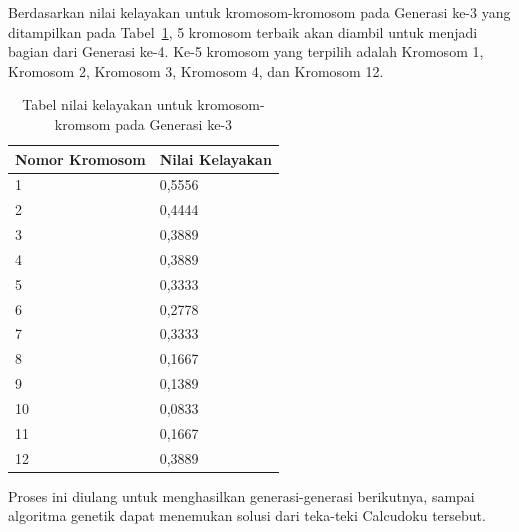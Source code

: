 \clearpage

Berdasarkan nilai kelayakan untuk kromosom-kromosom pada Generasi ke-3 yang ditampilkan pada Tabel~\ref{tab:analisishg4}, 5 kromosom terbaik akan diambil untuk menjadi bagian dari Generasi ke-4. Ke-5 kromosom yang terpilih adalah Kromosom 1, Kromosom 2, Kromosom 3, Kromosom 4, dan Kromosom 12.

\begin{table}
\centering
\captionsetup{justification=centering}
\begin{tabular}{| l | l |}
\hline
Nomor Kromosom & Nilai Kelayakan \\
\hline \hline
1 & 0,5556 \\
\hline
2 & 0,4444 \\
\hline
3 & 0,3889 \\
\hline
4 & 0,3889 \\
\hline
5 & 0,3333 \\
\hline
6 & 0,2778 \\
\hline
7 & 0,3333 \\
\hline
8 & 0,1667 \\
\hline
9 & 0,1389 \\
\hline
10 & 0,0833 \\
\hline
11 & 0,1667 \\
\hline
12 & 0,3889 \\
\hline
\end{tabular}
\caption[Tabel nilai kelayakan untuk kromosom-kromsom pada Generasi ke-3]{Tabel nilai kelayakan untuk kromosom-kromsom pada Generasi ke-3}
\label{tab:analisishg4}
\end{table}

Proses ini diulang untuk menghasilkan generasi-generasi berikutnya, sampai algoritma genetik dapat menemukan solusi dari teka-teki Calcudoku tersebut.